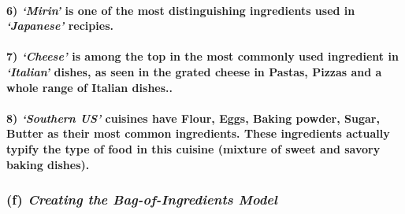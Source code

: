 \documentclass{article}
\begin{document}
\paragraph{\texorpdfstring{6) \emph{`Mirin'} is one of the most
distinguishing ingredients used in \emph{`Japanese'}
recipies.}{6) Mirin is one of the most distinguishing ingredients used in Japanese recipies.}}\label{mirin-is-one-of-the-most-distinguishing-ingredients-used-in-japanese-recipies.}

\paragraph{\texorpdfstring{7) \emph{`Cheese'} is among the top in the
most commonly used ingredient in \emph{`Italian'} dishes, as seen in the
grated cheese in Pastas, Pizzas and a whole range of Italian
dishes..}{7) Cheese is among the top in the most commonly used ingredient in Italian dishes, as seen in the grated cheese in Pastas, Pizzas and a whole range of Italian dishes..}}\label{cheese-is-among-the-top-in-the-most-commonly-used-ingredient-in-italian-dishes-as-seen-in-the-grated-cheese-in-pastas-pizzas-and-a-whole-range-of-italian-dishes..}

\paragraph{\texorpdfstring{8) \emph{`Southern US'} cuisines have Flour,
Eggs, Baking powder, Sugar, Butter as their most common ingredients.
These ingredients actually typify the type of food in this cuisine
(mixture of sweet and savory baking
dishes).}{8) Southern US cuisines have Flour, Eggs, Baking powder, Sugar, Butter as their most common ingredients. These ingredients actually typify the type of food in this cuisine (mixture of sweet and savory baking dishes).}}\label{southern-us-cuisines-have-flour-eggs-baking-powder-sugar-butter-as-their-most-common-ingredients.-these-ingredients-actually-typify-the-type-of-food-in-this-cuisine-mixture-of-sweet-and-savory-baking-dishes.}

    \subsubsection{\texorpdfstring{(f) \emph{Creating the Bag-of-Ingredients
Model}}{(f) Creating the Bag-of-Ingredients Model}}\label{f-creating-the-bag-of-ingredients-model}
\end{document}
